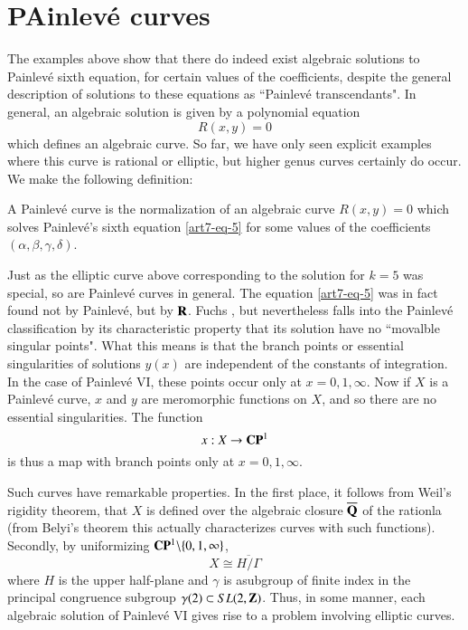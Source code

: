 \section{PAinlev\'e curves}\label{art7-sec-7}

The examples above show that there do indeed exist algebraic solutions to Painlev\'e sixth equation, for certain values of the coefficients, despite the general description of solutions to these equations as ``Painlev\'e transcendants". In general, an algebraic solution is given by a polynomial equation
$$
R(x,y) = 0
$$
which defines an algebraic curve. So far, we have only seen explicit examples where this curve is rational or elliptic, but higher genus curves certainly do occur. We make the following definition:

\setcounter{defin}{1}
\begin{defin}\label{art7-definition-2}
A Painlev\'e curve is the normalization of an algebraic curve $R(x,y)=0$ which solves Painlev\'e's sixth equation
\eqref{art7-eq-5} for some values of the coefficients $(\alpha, \beta, \gamma, \delta)$.
\end{defin}
 Just as the elliptic curve above corresponding to the solution for $k=5$ was special, so are Painlev\'e curves in general. The equation \eqref{art7-eq-5} was in fact found not by Painlev\'e, but by $\mathbf{R}$. Fuchs \cite{art7-key4}, but nevertheless falls into the Painlev\'e classification by its characteristic property that its solution have no ``movalble singular points". What this means is that the branch points or essential singularities of solutions $y(x)$ are independent of the constants of integration. In the case of Painlev\'e VI, these points occur only at $x=0,1, \infty$. Now if $X$ is a Painlev\'e curve, $x$ and $y$ are meromorphic functions on $X$, and so there are no essential singularities. The function
 $$
 x : X\rightarrow \mathbf{C}\mathbf{P}^{1}
 $$
 is thus a map with branch points only at $x=0,1, \infty.$

 Such curves have remarkable properties. In the first place, it follows from Weil's rigidity theorem\cite{art7-key17}, that $X$ is defined over the algebraic closure $\overline{\mathbf{Q}}$ of the rationla (from Belyi's theorem \cite{art7-key2} this actually characterizes curves with such functions). Secondly, by uniformizing $\mathbf{C}\mathbf{P}^{1}\backslash\{0,1,\infty\}$,
$$
X\cong \overline{H/\Gamma}
$$
where $H$ is the upper half-plane and $\gamma$ is asubgroup of finite index in the principal congruence subgroup $\gamma(2) \subset SL(2,\mathbf{Z})$. Thus, in some manner, each algebraic solution of Painlev\'e VI gives rise to a problem involving elliptic curves.


